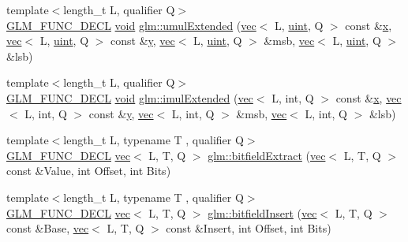 \begin{DoxyCompactItemize}
{\footnotesize template$<$length\+\_\+t L, qualifier Q$>$ }\\\hyperlink{setup_8hpp_ab2d052de21a70539923e9bcbf6e83a51}{G\+L\+M\+\_\+\+F\+U\+N\+C\+\_\+\+D\+E\+CL} \hyperlink{_s_d_l__opengles2__gl2ext_8h_ae5d8fa23ad07c48bb609509eae494c95}{void} \hyperlink{group__core__func__integer_ga732e2fb56db57ea541c7e5c92b7121be}{glm\+::umul\+Extended} (\hyperlink{structglm_1_1vec}{vec}$<$ L, \hyperlink{group__core__precision_ga4fd29415871152bfb5abd588334147c8}{uint}, Q $>$ const \&\hyperlink{_s_d_l__opengl_8h_ad0e63d0edcdbd3d79554076bf309fd47}{x}, \hyperlink{structglm_1_1vec}{vec}$<$ L, \hyperlink{group__core__precision_ga4fd29415871152bfb5abd588334147c8}{uint}, Q $>$ const \&\hyperlink{_s_d_l__opengl_8h_a1675d9d7bb68e1657ff028643b4037e3}{y}, \hyperlink{structglm_1_1vec}{vec}$<$ L, \hyperlink{group__core__precision_ga4fd29415871152bfb5abd588334147c8}{uint}, Q $>$ \&msb, \hyperlink{structglm_1_1vec}{vec}$<$ L, \hyperlink{group__core__precision_ga4fd29415871152bfb5abd588334147c8}{uint}, Q $>$ \&lsb)
\item 
{\footnotesize template$<$length\+\_\+t L, qualifier Q$>$ }\\\hyperlink{setup_8hpp_ab2d052de21a70539923e9bcbf6e83a51}{G\+L\+M\+\_\+\+F\+U\+N\+C\+\_\+\+D\+E\+CL} \hyperlink{_s_d_l__opengles2__gl2ext_8h_ae5d8fa23ad07c48bb609509eae494c95}{void} \hyperlink{group__core__func__integer_gac0c510a70e852f57594a9141848642e3}{glm\+::imul\+Extended} (\hyperlink{structglm_1_1vec}{vec}$<$ L, int, Q $>$ const \&\hyperlink{_s_d_l__opengl_8h_ad0e63d0edcdbd3d79554076bf309fd47}{x}, \hyperlink{structglm_1_1vec}{vec}$<$ L, int, Q $>$ const \&\hyperlink{_s_d_l__opengl_8h_a1675d9d7bb68e1657ff028643b4037e3}{y}, \hyperlink{structglm_1_1vec}{vec}$<$ L, int, Q $>$ \&msb, \hyperlink{structglm_1_1vec}{vec}$<$ L, int, Q $>$ \&lsb)
\item 
{\footnotesize template$<$length\+\_\+t L, typename T , qualifier Q$>$ }\\\hyperlink{setup_8hpp_ab2d052de21a70539923e9bcbf6e83a51}{G\+L\+M\+\_\+\+F\+U\+N\+C\+\_\+\+D\+E\+CL} \hyperlink{structglm_1_1vec}{vec}$<$ L, T, Q $>$ \hyperlink{group__core__func__integer_ga346b25ab11e793e91a4a69c8aa6819f2}{glm\+::bitfield\+Extract} (\hyperlink{structglm_1_1vec}{vec}$<$ L, T, Q $>$ const \&Value, int Offset, int Bits)
\item 
{\footnotesize template$<$length\+\_\+t L, typename T , qualifier Q$>$ }\\\hyperlink{setup_8hpp_ab2d052de21a70539923e9bcbf6e83a51}{G\+L\+M\+\_\+\+F\+U\+N\+C\+\_\+\+D\+E\+CL} \hyperlink{structglm_1_1vec}{vec}$<$ L, T, Q $>$ \hyperlink{group__core__func__integer_ga2e82992340d421fadb61a473df699b20}{glm\+::bitfield\+Insert} (\hyperlink{structglm_1_1vec}{vec}$<$ L, T, Q $>$ const \&Base, \hyperlink{structglm_1_1vec}{vec}$<$ L, T, Q $>$ const \&Insert, int Offset, int Bits)

\end{DoxyCompactItemize}
